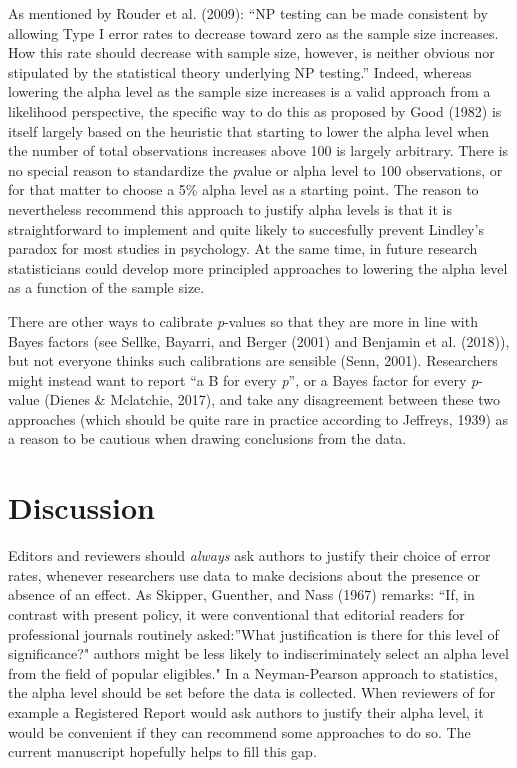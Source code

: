 \documentclass[,jou,floatsintext]{apa6}
\begin{document}
As mentioned by Rouder et al. (2009): \enquote{NP testing can be made consistent by allowing Type I error rates to decrease toward zero as the sample size increases. How this rate should decrease with sample size, however, is neither obvious nor stipulated by the statistical theory underlying NP testing.} Indeed, whereas lowering the alpha level as the sample size increases is a valid approach from a likelihood perspective, the specific way to do this as proposed by Good (1982) is itself largely based on the heuristic that starting to lower the alpha level when the number of total observations increases above 100 is largely arbitrary. There is no special reason to standardize the \emph{p}value or alpha level to 100 observations, or for that matter to choose a 5\% alpha level as a starting point. The reason to nevertheless recommend this approach to justify alpha levels is that it is straightforward to implement and quite likely to succesfully prevent Lindley's paradox for most studies in psychology. At the same time, in future research statisticians could develop more principled approaches to lowering the alpha level as a function of the sample size.

There are other ways to calibrate \emph{p}-values so that they are more in line with Bayes factors (see Sellke, Bayarri, and Berger (2001) and Benjamin et al. (2018)), but not everyone thinks such calibrations are sensible (Senn, 2001). Researchers might instead want to report \enquote{a B for every \emph{p}}, or a Bayes factor for every \emph{p}-value (Dienes \& Mclatchie, 2017), and take any disagreement between these two approaches (which should be quite rare in practice according to Jeffreys, 1939) as a reason to be cautious when drawing conclusions from the data.

\hypertarget{discussion}{%
\section{Discussion}\label{discussion}}

Editors and reviewers should \emph{always} ask authors to justify their choice of error rates, whenever researchers use data to make decisions about the presence or absence of an effect. As Skipper, Guenther, and Nass (1967) remarks: \enquote{If, in contrast with present policy, it were conventional that editorial readers for professional journals routinely asked:}What justification is there for this level of significance?" authors might be less likely to indiscriminately select an alpha level from the field of popular eligibles." In a Neyman-Pearson approach to statistics, the alpha level should be set before the data is collected. When reviewers of for example a Registered Report would ask authors to justify their alpha level, it would be convenient if they can recommend some approaches to do so. The current manuscript hopefully helps to fill this gap.
\end{document}
